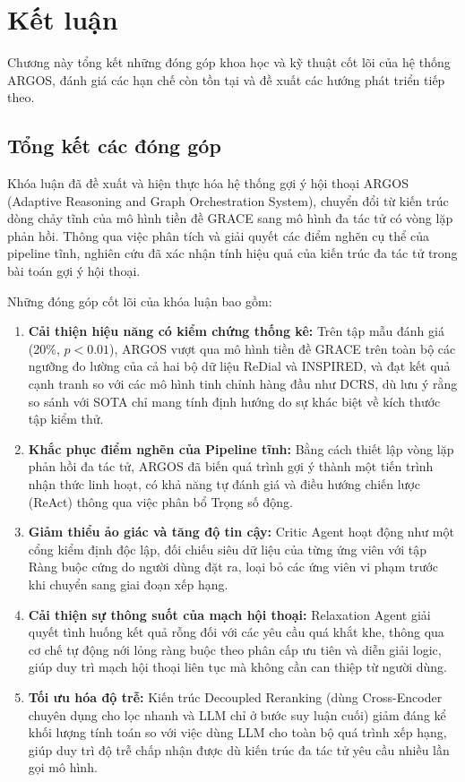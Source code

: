 \chapter*{Kết luận}\label{chap:conclusion}

Chương này tổng kết những đóng góp khoa học và kỹ thuật cốt lõi của hệ thống ARGOS, đánh giá các hạn chế còn tồn tại và đề xuất các hướng phát triển tiếp theo.


\section{Tổng kết các đóng góp}
Khóa luận đã đề xuất và hiện thực hóa hệ thống gợi ý hội thoại ARGOS (Adaptive Reasoning and Graph Orchestration System), chuyển đổi từ kiến trúc dòng chảy tĩnh của mô hình tiền đề GRACE sang mô hình đa tác tử có vòng lặp phản hồi. Thông qua việc phân tích và giải quyết các điểm nghẽn cụ thể của pipeline tĩnh, nghiên cứu đã xác nhận tính hiệu quả của kiến trúc đa tác tử trong bài toán gợi ý hội thoại.

Những đóng góp cốt lõi của khóa luận bao gồm:
\begin{enumerate}
  \item \textbf{Cải thiện hiệu năng có kiểm chứng thống kê:} Trên tập mẫu đánh giá (20\%, $p < 0.01$), ARGOS vượt qua mô hình tiền đề GRACE trên toàn bộ các ngưỡng đo lường của cả hai bộ dữ liệu ReDial và INSPIRED, và đạt kết quả cạnh tranh so với các mô hình tinh chỉnh hàng đầu như DCRS, dù lưu ý rằng so sánh với SOTA chỉ mang tính định hướng do sự khác biệt về kích thước tập kiểm thử.
  \item \textbf{Khắc phục điểm nghẽn của Pipeline tĩnh:} Bằng cách thiết lập vòng lặp phản hồi đa tác tử, ARGOS đã biến quá trình gợi ý thành một tiến trình nhận thức linh hoạt, có khả năng tự đánh giá và điều hướng chiến lược (ReAct) thông qua việc phân bổ Trọng số động.
  \item \textbf{Giảm thiểu ảo giác và tăng độ tin cậy:} Critic Agent hoạt động như một cổng kiểm định độc lập, đối chiếu siêu dữ liệu của từng ứng viên với tập Ràng buộc cứng do người dùng đặt ra, loại bỏ các ứng viên vi phạm trước khi chuyển sang giai đoạn xếp hạng.
  \item \textbf{Cải thiện sự thông suốt của mạch hội thoại:} Relaxation Agent giải quyết tình huống kết quả rỗng đối với các yêu cầu quá khắt khe, thông qua cơ chế tự động nới lỏng ràng buộc theo phân cấp ưu tiên và diễn giải logic, giúp duy trì mạch hội thoại liên tục mà không cần can thiệp từ người dùng.
  \item \textbf{Tối ưu hóa độ trễ:} Kiến trúc Decoupled Reranking (dùng Cross-Encoder chuyên dụng cho lọc nhanh và LLM chỉ ở bước suy luận cuối) giảm đáng kể khối lượng tính toán so với việc dùng LLM cho toàn bộ quá trình xếp hạng, giúp duy trì độ trễ chấp nhận được dù kiến trúc đa tác tử yêu cầu nhiều lần gọi mô hình.
\end{enumerate}

